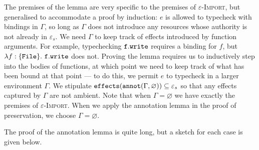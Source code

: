 The premises of the lemma are very specific to the premises of \textsc{$\varepsilon$-Import}, but generalised to accommodate a proof by induction: $e$ is allowed to typecheck with bindings in $\Gamma$, so long as $\Gamma$ does not introduce any resources whose authority is not already in $\varepsilon_s$. We need $\Gamma$ to keep track of effects introduced by function arguments. For example, typechecking $\mathtt{f.write}$ requires a binding for $f$, but $\lambda f: \{\mathtt{File}\}.~\mathtt{f.write}$ does not. Proving the lemma requires us to inductively step into the bodies of functions, at which point we need to keep track of what has been bound at that point --- to do this, we permit $e$ to typecheck in a larger environment $\Gamma$. We stipulate $\mathtt{effects}(\mathtt{annot}(\Gamma, \varnothing)) \subseteq \varepsilon_s$ so that any effects captured by $\Gamma$ are not ambient. Note that when $\Gamma = \varnothing$ we have exactly the premises of \textsc{$\varepsilon$-Import}. When we apply the annotation lemma in the proof of preservation, we choose $\Gamma = \varnothing$.

The proof of the annotation lemma is quite long, but a sketch for each case is given below.


